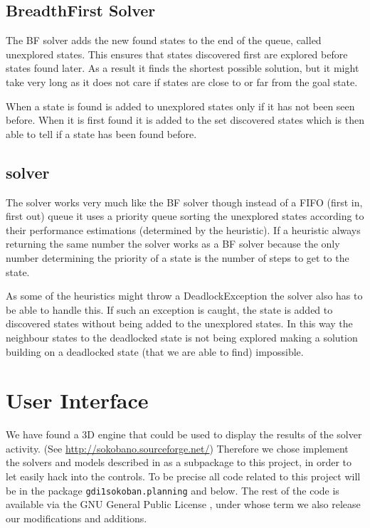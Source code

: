 \subsection{BreadthFirst Solver}
The BF solver adds the new found states to the end of the queue,
called unexplored states. This ensures that states discovered first
are explored before states found later. As a result it finds the
shortest possible solution, but it might take very long as it does not
care if states are close to or far from the goal state.

When a state is found is added to unexplored states only if it has not
been seen before. When it is first found it is added to the set
discovered states which is then able to tell if a state has been found
before.

\subsection{\astar solver}
The \astar solver works very much like the BF solver though instead of
a FIFO (first in, first out) queue it uses a priority queue sorting
the unexplored states according to their performance estimations
(determined by the heuristic). If a heuristic always returning the
same number the solver works as a BF solver because the only number
determining the priority of a state is the number of steps to get to
the state.

As some of the heuristics might throw a DeadlockException the \astar
solver also has to be able to handle this. If such an exception is
caught, the state is added to discovered states without being added to
the unexplored states. In this way the neighbour states to the
deadlocked state is not being explored making a solution building on a
deadlocked state (that we are able to find) impossible.

\section{User Interface}
We have found a 3D engine that could be used to display the results of
the solver activity. (See \url{http://sokobano.sourceforge.net/})
Therefore we chose implement the solvers and models described in as a
subpackage to this project, in order to let easily hack into the
controls. To be precise all code related to this project will be in
the package \texttt{gdi1sokoban.planning} and below. The rest of the
code is available via the GNU General Public License \cite{gpl}, under whose term
we also release our modifications and additions.
